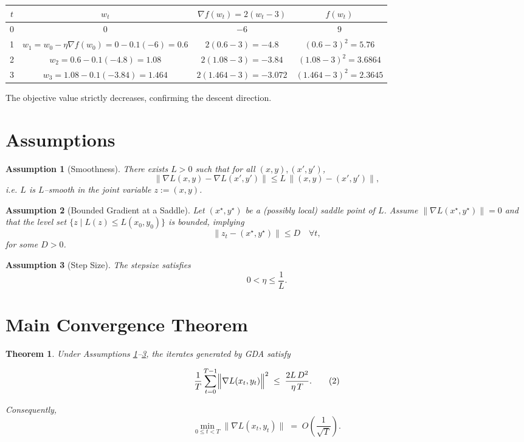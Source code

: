\documentclass{article}
\newtheorem{theorem}{Theorem}
\newtheorem{assumption}{Assumption}
\begin{document}
\begin{center}
\begin{tabular}{c|c|c|c}
$t$ & $w_t$ & $\nabla f(w_t)=2(w_t-3)$ & $f(w_t)$\\ \hline
0 & $0$ & $-6$ & $9$\\
1 & $w_1 = w_0 -\eta\nabla f(w_0)=0-0.1(-6)=0.6$ &
$2(0.6-3)=-4.8$ & $ (0.6-3)^2=5.76$\\
2 & $w_2 = 0.6-0.1(-4.8)=1.08$ &
$2(1.08-3)=-3.84$ & $(1.08-3)^2=3.6864$\\
3 & $w_3 = 1.08-0.1(-3.84)=1.464$ &
$2(1.464-3)=-3.072$ & $(1.464-3)^2=2.3645$\\
\end{tabular}
\end{center}
The objective value strictly decreases, confirming the descent direction.

\newpage
\section*{Assumptions}
\begin{assumption}[Smoothness]\label{ass:smooth}
There exists $L>0$ such that for all $(x,y),(x',y')$,
\[
\|\nabla L(x,y)-\nabla L(x',y')\| \le L\,
\big\|(x,y)-(x',y')\big\|,
\]
i.e. $L$ is $L$–smooth in the joint variable $z:=(x,y)$.
\end{assumption}

\begin{assumption}[Bounded Gradient at a Saddle]\label{ass:bounded}
Let $(x^\star,y^\star)$ be a (possibly local) saddle point of $L$.
Assume $\| \nabla L(x^\star,y^\star)\|=0$ and that the level set 
$\{z\mid L(z)\le L(x_0,y_0)\}$ is bounded, implying
\[
\|z_t-(x^\star,y^\star)\|\le D\quad\forall t,
\]
for some $D>0$.
\end{assumption}

\begin{assumption}[Step Size]\label{ass:stepsize}
The stepsize satisfies 
\[
0<\eta\le \frac{1}{L}.
\]
\end{assumption}

\section*{Main Convergence Theorem}
\begin{theorem}\label{thm:main}
Under Assumptions \ref{ass:smooth}–\ref{ass:stepsize}, the iterates generated by GDA satisfy  

\[
\frac{1}{T}\sum_{t=0}^{T-1}
\Bigl\|\nabla L(x_t,y_t)\Bigr\|^{2}
\;\le\;
\frac{2L\,D^{2}}{\eta\,T}.
\tag{2}
\]

Consequently,
\[
\min_{0\le t<T}\bigl\|\nabla L(x_t,y_t)\bigr\|
\;=\;O\!\left(\frac{1}{\sqrt{T}}\right).
\]
\end{theorem}
\end{document}
